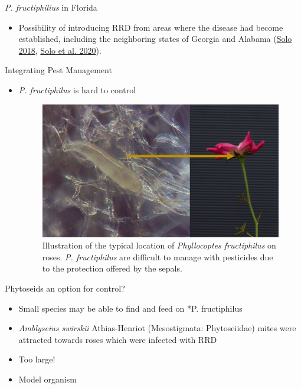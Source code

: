 \documentclass[
  ignorenonframetext,
]{beamer}
\providecommand{\tightlist}{%
  \setlength{\itemsep}{0pt}\setlength{\parskip}{0pt}}
\begin{document}
\begin{frame}
\begin{block}{\emph{P. fructiphilius} in Florida}
\begin{itemize}
\tightlist
\item
  Possibility of introducing RRD from areas where the disease had become
  established, including the neighboring states of Georgia and Alabama
  (\protect\hyperlink{ref-Solo2018}{Solo 2018},
  \protect\hyperlink{ref-Solo2020}{Solo et al. 2020}).
\end{itemize}
\end{block}

\begin{block}{Integrating Pest Management}
\protect\hypertarget{integrating-pest-management}{}
\begin{itemize}
\tightlist
\item
  \emph{P. fructiphilus} is hard to control

  \begin{figure}
  \includegraphics[width=0.8\linewidth]{figure/mite-pfruct-hide} \caption{Illustration of the typical location of \textit{Phyllocoptes fructiphilus} on roses. \textit{P. fructiphilus} are difficult to manage with pesticides due to the protection offered by the sepals.}\label{fig:hiding}
  \end{figure}
\end{itemize}
\end{block}

\begin{block}{Phytoseids an option for control?}
\protect\hypertarget{phytoseids-an-option-for-control}{}
\begin{itemize}
\tightlist
\item
  Small species may be able to find and feed on *P. fructiphilus
\item
  \emph{Amblyseius swirskii} Athias-Henriot (Mesostigmata: Phytoseiidae)
  mites were attracted towards roses which were infected with RRD
\item
  Too large!
\item
  Model organism
\end{itemize}
\end{block}


\end{frame}
\end{document}
